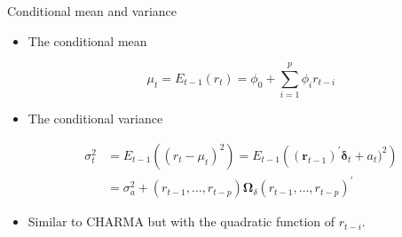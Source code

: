 \documentclass[presentation,10pt]{beamer}
\begin{document}
\begin{frame}[label={sec:orga3c595c}]{Conditional mean and variance}
\begin{itemize}
\item The conditional mean

\[\mu_t = E_{t-1}(r_t) = \phi_0 + \sum_{i=1}^p \phi_i r_{t-i} \]

\item The conditional variance

\begin{equation*}
\begin{split}
\sigma^2_t &= E_{t-1} \left((r_t - \mu_t)^2 \right) = E_{t-1} \left((\mathbf{r}_{t-1})^{\prime} \boldsymbol{\delta}_t + a_t)^2 \right) \\
&= \sigma^2_a + (r_{t-1}, \ldots, r_{t-p}) \boldsymbol{\Omega}_{\delta} (r_{t-1}, \ldots, r_{t-p})^{\prime}
\end{split}
\end{equation*}

\item Similar to CHARMA but with the quadratic function of \(r_{t-i}\).
\end{itemize}
\end{frame}
\end{document}
